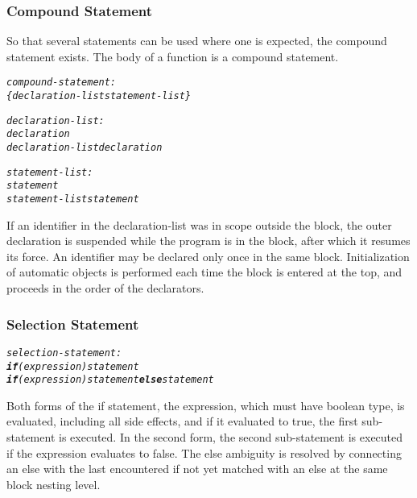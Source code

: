 \documentclass[12pt]{report}
\begin{document}
\subsubsection{Compound Statement}
\begin{doublespace}
So that several statements can be used where one is expected, the compound statement exists. The body of a function is a compound statement.
\begin{singlespace}
\begin{alltt}
         \textit{compound-statement:}
              \textit{\{ declaration-list statement-list \}}
              
         \textit{declaration-list:}
              \textit{declaration}
              \textit{declaration-list declaration}
              
         \textit{statement-list:}
              \textit{statement}
              \textit{statement-list statement}
\end{alltt}
\end{singlespace}
If an identifier in the declaration-list was in scope outside the block, the outer declaration is suspended while the program is in the block, after which it resumes its force. An identifier may be declared only once in the same block. Initialization of automatic objects is performed each time the block is entered at the top, and proceeds in the order of the declarators. 
\end{doublespace}

\subsubsection{Selection Statement}
\begin{alltt}
         \textit{selection-statement:}
              \textit{\textbf{if} (expression) statement}
              \textit{\textbf{if} (expression) statement \textbf{else} statement}
\end{alltt}
\begin{doublespace}
Both forms of the if statement, the expression, which must have boolean type, is evaluated, including all side effects, and if it evaluated to true, the first sub-statement is executed. In the second form, the second sub-statement is executed if the expression evaluates to false. The else ambiguity is resolved by connecting an else with the last encountered if not yet matched with an else at the same block nesting level.
\end{doublespace}
\end{document}
